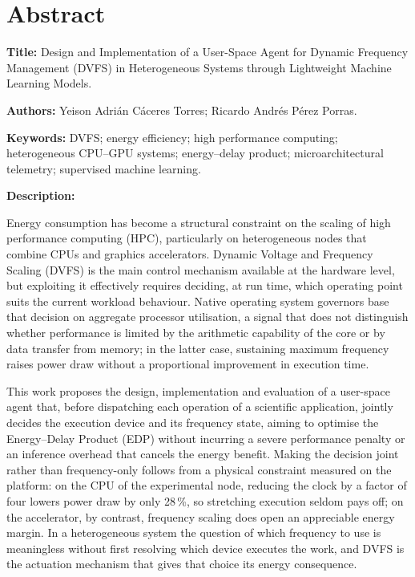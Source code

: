 \documentclass[12pt,oneside,spanish]{book}
\begin{document}


\chapter*{Abstract}

\vspace{1cm}

\noindent\textbf{Title:} Design and Implementation of a User-Space Agent for Dynamic Frequency Management (DVFS) in Heterogeneous Systems through Lightweight Machine Learning Models.

\medskip

\noindent\textbf{Authors:} Yeison Adrián Cáceres Torres; Ricardo Andrés Pérez Porras.

\medskip

\noindent\textbf{Keywords:} DVFS; energy efficiency; high performance computing; heterogeneous CPU--GPU systems; energy--delay product; microarchitectural telemetry; supervised machine learning.

\vspace{0.5cm}

\noindent\textbf{Description:}

Energy consumption has become a structural constraint on the scaling of high performance computing (HPC), particularly on heterogeneous nodes that combine CPUs and graphics accelerators. Dynamic Voltage and Frequency Scaling (DVFS) is the main control mechanism available at the hardware level, but exploiting it effectively requires deciding, at run time, which operating point suits the current workload behaviour. Native operating system governors base that decision on aggregate processor utilisation, a signal that does not distinguish whether performance is limited by the arithmetic capability of the core or by data transfer from memory; in the latter case, sustaining maximum frequency raises power draw without a proportional improvement in execution time.

This work proposes the design, implementation and evaluation of a user-space agent that, before dispatching each operation of a scientific application, jointly decides the execution device and its frequency state, aiming to optimise the Energy--Delay Product (EDP) without incurring a severe performance penalty or an inference overhead that cancels the energy benefit. Making the decision joint rather than frequency-only follows from a physical constraint measured on the platform: on the CPU of the experimental node, reducing the clock by a factor of four lowers power draw by only 28\,\%, so stretching execution seldom pays off; on the accelerator, by contrast, frequency scaling does open an appreciable energy margin. In a heterogeneous system the question of which frequency to use is meaningless without first resolving which device executes the work, and DVFS is the actuation mechanism that gives that choice its energy consequence.
\end{document}
